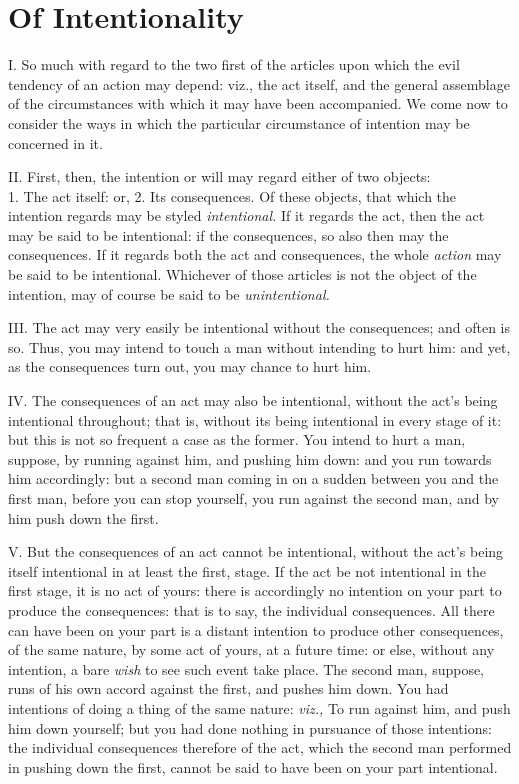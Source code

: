 \documentclass[12pt]{report}
\begin{document}
\chapter{Of Intentionality}

I. So much with regard to the two first of the articles upon which the
evil tendency of an action may depend: viz., the act itself, and the
general assemblage of the circumstances with which it may have been
accompanied. We come now to consider the ways in which the particular
circumstance of intention may be concerned in it.

II. First, then, the intention or will may regard either of two
objects:\\
1. The act itself: or, 2. Its consequences. Of these objects, that which
the intention regards may be styled \emph{intentional.} If it regards
the act, then the act may be said to be intentional: if the
consequences, so also then may the consequences. If it regards both the
act and consequences, the whole \emph{action} may be said to be
intentional. Whichever of those articles is not the object of the
intention, may of course be said to be \emph{unintentional.}

III. The act may very easily be intentional without the consequences;
and often is so. Thus, you may intend to touch a man without intending
to hurt him: and yet, as the consequences turn out, you may chance to
hurt him.

IV. The consequences of an act may also be intentional, without the
act's being intentional throughout; that is, without its being
intentional in every stage of it: but this is not so frequent a case as
the former. You intend to hurt a man, suppose, by running against him,
and pushing him down: and you run towards him accordingly: but a second
man coming in on a sudden between you and the first man, before you can
stop yourself, you run against the second man, and by him push down the
first.

V. But the consequences of an act cannot be intentional, without the
act's being itself intentional in at least the first, stage. If the act
be not intentional in the first stage, it is no act of yours: there is
accordingly no intention on your part to produce the consequences: that
is to say, the individual consequences. All there can have been on your
part is a distant intention to produce other consequences, of the same
nature, by some act of yours, at a future time: or else, without any
intention, a bare \emph{wish} to see such event take place. The second
man, suppose, runs of his own accord against the first, and pushes him
down. You had intentions of doing a thing of the same nature:
\emph{viz.,} To run against him, and push him down yourself; but you had
done nothing in pursuance of those intentions: the individual
consequences therefore of the act, which the second man performed in
pushing down the first, cannot be said to have been on your part
intentional.
\end{document}
